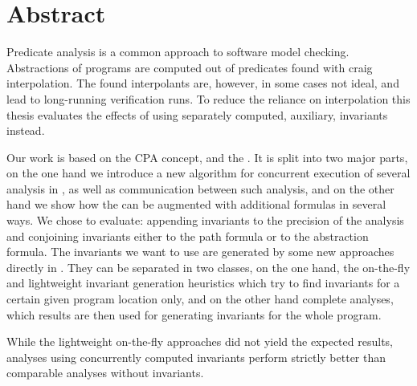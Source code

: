 \chapter*{Abstract}
Predicate analysis is a common approach to software model checking. Abstractions of programs are computed out of predicates found with craig interpolation. The found interpolants are, however,
in some cases not ideal, and lead to long-running verification runs. To reduce the reliance on interpolation this thesis evaluates the effects of using separately computed, auxiliary, invariants instead.

Our work is based on the CPA concept, \CPAchecker{} and the \PredicateCPA{}. It is split into two major parts, on the one hand we introduce a new algorithm for concurrent execution of several analysis in 
\CPAchecker{}, as well as communication between such analysis,
and on the other hand we show how the \PredicateCPA{} can be augmented with additional formulas in several ways. We chose to evaluate: appending invariants to the precision of the analysis and 
conjoining invariants either to the path formula or to the abstraction formula. The invariants we want to use are generated by some new approaches directly in \CPAchecker{}. They can
be separated in two classes, on the one hand, the on-the-fly and lightweight invariant generation heuristics which try to find invariants for a certain given program location only, and
on the other hand complete analyses, which results are then used for generating invariants for the whole program. 

While the lightweight on-the-fly approaches did not yield the expected results, analyses using concurrently computed invariants perform strictly better than comparable analyses without invariants.



